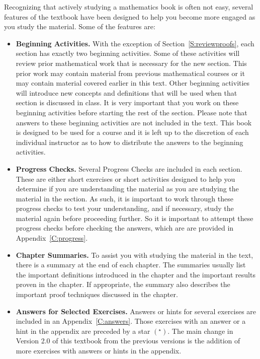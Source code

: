 Recognizing that actively studying a mathematics book is often not easy, several features of the textbook have been designed to help you become more engaged as you study the material.  Some of the features are:
\begin{itemize}
  \item \textbf{Beginning Activities.}  %
With the exception of Section~\ref{S:reviewproofs}, each section has exactly two beginning activities.  Some of these  activities will review prior mathematical work that is necessary for the new section.  This prior work may contain material from previous mathematical courses or it may contain material covered earlier in this text.  Other beginning activities will introduce new concepts and definitions that will be used when that section is discussed in class.   It is very important that you work on these beginning activities before starting the rest of the section.   Please note that answers to these beginning activities are not included in the text.  This book is designed to be used for a course and it is left up to the discretion of each individual instructor as to how to distribute the answers to the beginning activities.

\item \textbf{Progress Checks.}  Several Progress Checks are included in each section.  These are either short exercises or short activities designed to help you determine if you are understanding the material as you are studying the material in the section.  As such, it is important to work through these progress checks to test your understanding, and if necessary, study the material again before proceeding further.  So it is important to attempt these progress checks before checking the answers, which are are provided in Appendix~\ref{C:progress}.

\item \textbf{Chapter Summaries.}  To assist you with studying the material in the text, there is a summary at the end of each chapter.  The summaries usually list the important definitions introduced in the chapter and the important results proven in the chapter.  If appropriate, the summary also describes the important proof techniques discussed in the chapter.

\item \textbf{Answers for Selected Exercises.}  Answers or hints for several exercises are included in an Appendix~\ref{C:answers}.    Those exercises with an answer or a hint in the appendix are preceded by a star $\left( ^\star \right)$.  The main change in Version 2.0 of this textbook from the previous versions is the addition of more exercises with answers or hints in the appendix.
\end{itemize}

